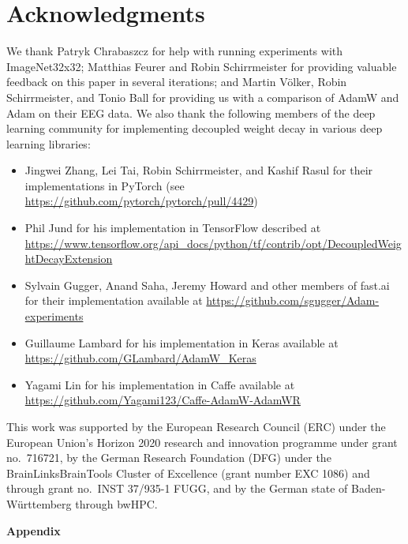 \documentclass[usenames,dvipsnames]{article} %
\begin{document}
\section{Acknowledgments}

We thank Patryk Chrabaszcz for help with running experiments with ImageNet32x32; Matthias Feurer and Robin Schirrmeister for providing valuable feedback on this paper in several iterations; and Martin V\"{o}lker, Robin Schirrmeister, and Tonio Ball for providing us with a comparison of AdamW and Adam on their EEG data. 
%
We also thank the following members of the deep learning community for implementing decoupled weight decay in various deep learning libraries: 
\newcommand{\denselist}{\itemsep 0pt\partopsep -20pt}
\begin{itemize}
\denselist
\item Jingwei Zhang, Lei Tai, Robin Schirrmeister, and Kashif Rasul for their implementations in PyTorch (see \url{https://github.com/pytorch/pytorch/pull/4429})
\item Phil Jund for his implementation in TensorFlow described at\\ \url{https://www.tensorflow.org/api_docs/python/tf/contrib/opt/DecoupledWeightDecayExtension} 
\item Sylvain Gugger, Anand Saha, Jeremy Howard and other members of fast.ai for their implementation available at \url{https://github.com/sgugger/Adam-experiments}
\item Guillaume Lambard for his implementation in Keras available at \url{ https://github.com/GLambard/AdamW_Keras  }
\item Yagami Lin for his implementation in Caffe available at \url{ https://github.com/Yagami123/Caffe-AdamW-AdamWR  }
\end{itemize}

This work was supported by the European Research Council (ERC) under the European Union's Horizon 2020 research and innovation programme under grant no.\ 716721, by the German Research Foundation (DFG) under the BrainLinksBrainTools Cluster of Excellence (grant number EXC 1086) and through grant no.\ INST 37/935-1 FUGG, and by the German state of Baden-W\"{u}rttemberg through bwHPC. 




\cleardoublepage
\setcounter{page}{1}

\appendix
{\begin{center}\Large{\textbf{Appendix}}\end{center}}
\end{document}

